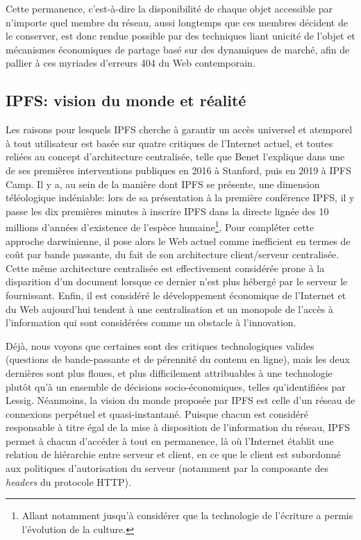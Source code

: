 \documentclass{article}
\begin{document}
Cette permanence, c'est-à-dire la disponibilité de chaque objet accessible par n'importe quel membre du réseau, aussi longtemps que ces membres décident de le conserver, est donc rendue possible par des techniques liant unicité de l'objet et mécanismes économiques de partage basé sur des dynamiques de marché, afin de pallier à ces myriades d'erreurs 404 du Web contemporain.

\subsection{IPFS: vision du monde et réalité}

Les raisons pour lesquels IPFS cherche à garantir un accès universel et atemporel à tout utilisateur est basée sur quatre critiques de l'Internet actuel, et toutes reliées au concept d'architecture centralisée, telle que Benet l'explique dans une de ses premières interventions publiques en 2016 à Stanford\cite{stanfordonline_stanford_2015}, puis en 2019 à IPFS Camp\cite{benet_ipfs_2014}. Il y a, au sein de la manière dont IPFS se présente, une dimension téléologique indéniable: lors de sa présentation à la première conférence IPFS, il y passe les dix premières minutes à inscrire IPFS dans la directe lignée des 10 millions d'années d'existence de l'espèce humaine\footnote{Allant notamment jusqu'à considérer que la technologie de l'écriture a permis l'évolution de la culture.}. Pour compléter cette approche darwinienne, il pose alors le Web actuel comme inefficient en termes de coût par bande passante, du fait de son architecture client/serveur centralisée. Cette même architecture centralisée est effectivement considérée prone à la disparition d'un document lorsque ce dernier n'est plus hébergé par le serveur le fournissant. Enfin, il est considéré le développement économique de l'Internet et du Web aujourd'hui tendent à une centralisation et un monopole de l'accès à l'information qui sont considérées comme un obstacle à l'innovation.

Déjà, nous voyons que certaines sont des critiques technologiques valides (questions de bande-passante et de pérennité du contenu en ligne), mais les deux dernières sont plus floues, et plus difficilement attribuables à une technologie plutôt qu'à un ensemble de décisions socio-économiques, telles qu'identifiées par Lessig. Néanmoins, la vision du monde proposée par IPFS est celle d'un réseau de connexions perpétuel et quasi-instantané. Puisque chacun est considéré responsable à titre égal de la mise à disposition de l'information du réseau, IPFS permet à chacun d'accéder à tout en permanence, là où l'Internet établit une relation de hiérarchie entre serveur et client, en ce que le client est subordonné aux politiques d'autorisation du serveur (notamment par la composante des \emph{headers} du protocole HTTP).
\end{document}
